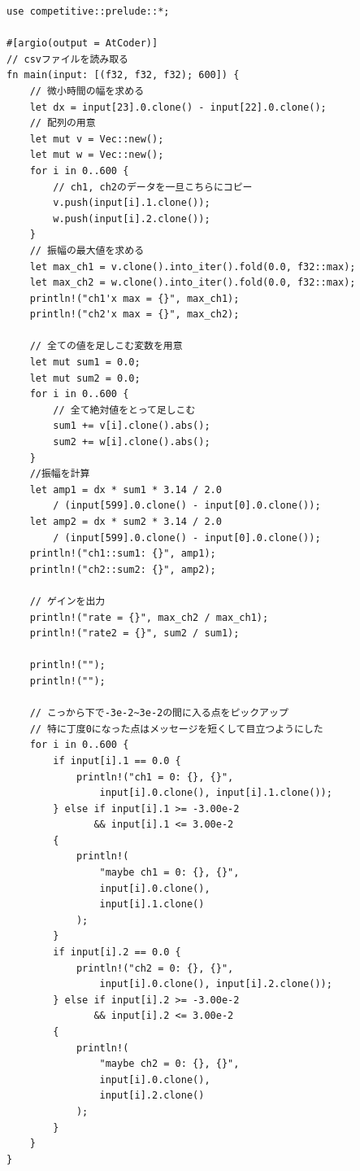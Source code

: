 \documentclass[uplatex, 11pt,a4j, titlepage]{jsarticle}
\begin{document}
\begin{lstlisting}[caption={csv\_manager.rs}]
    use competitive::prelude::*;

#[argio(output = AtCoder)]
// csvファイルを読み取る
fn main(input: [(f32, f32, f32); 600]) {
    // 微小時間の幅を求める
    let dx = input[23].0.clone() - input[22].0.clone(); 
    // 配列の用意
    let mut v = Vec::new(); 
    let mut w = Vec::new();
    for i in 0..600 {
        // ch1, ch2のデータを一旦こちらにコピー
        v.push(input[i].1.clone()); 
        w.push(input[i].2.clone());
    }
    // 振幅の最大値を求める
    let max_ch1 = v.clone().into_iter().fold(0.0, f32::max); 
    let max_ch2 = w.clone().into_iter().fold(0.0, f32::max);
    println!("ch1'x max = {}", max_ch1);
    println!("ch2'x max = {}", max_ch2);

    // 全ての値を足しこむ変数を用意
    let mut sum1 = 0.0; 
    let mut sum2 = 0.0;
    for i in 0..600 {
        // 全て絶対値をとって足しこむ
        sum1 += v[i].clone().abs(); 
        sum2 += w[i].clone().abs();
    }
    //振幅を計算 
    let amp1 = dx * sum1 * 3.14 / 2.0 
        / (input[599].0.clone() - input[0].0.clone()); 
    let amp2 = dx * sum2 * 3.14 / 2.0 
        / (input[599].0.clone() - input[0].0.clone());
    println!("ch1::sum1: {}", amp1);
    println!("ch2::sum2: {}", amp2);

    // ゲインを出力
    println!("rate = {}", max_ch2 / max_ch1); 
    println!("rate2 = {}", sum2 / sum1);

    println!("");
    println!("");

    // こっから下で-3e-2~3e-2の間に入る点をピックアップ
    // 特に丁度0になった点はメッセージを短くして目立つようにした
    for i in 0..600 {
        if input[i].1 == 0.0 {
            println!("ch1 = 0: {}, {}", 
                input[i].0.clone(), input[i].1.clone());
        } else if input[i].1 >= -3.00e-2 
               && input[i].1 <= 3.00e-2 
        {
            println!(
                "maybe ch1 = 0: {}, {}",
                input[i].0.clone(),
                input[i].1.clone()
            );
        }
        if input[i].2 == 0.0 {
            println!("ch2 = 0: {}, {}", 
                input[i].0.clone(), input[i].2.clone());
        } else if input[i].2 >= -3.00e-2 
               && input[i].2 <= 3.00e-2 
        {
            println!(
                "maybe ch2 = 0: {}, {}",
                input[i].0.clone(),
                input[i].2.clone()
            );
        }
    }
}
\end{lstlisting}
\end{document}
